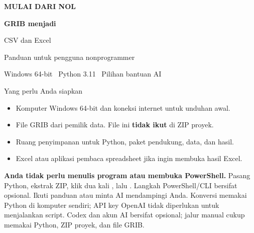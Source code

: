 \documentclass[11pt,a4paper]{article}
\begin{document}
\label{pg:start}
\color{ink}
{\color{teal}\small\bfseries MULAI DARI NOL}\par
{\color{slate}\Huge\bfseries GRIB menjadi\par CSV dan Excel}\par
\vspace{2mm}
{\Large Panduan untuk pengguna nonprogrammer}\par
Windows 64-bit \textbullet\ Python 3.11 \textbullet\ Pilihan bantuan AI\par
\vspace{6mm}
\par\noindent{}\par
\vspace{4mm}
\begin{panel}{Yang perlu Anda siapkan}
\begin{itemize}
\item Komputer Windows 64-bit dan koneksi internet untuk unduhan awal.
\item File GRIB dari pemilik data. File ini \textbf{tidak ikut} di ZIP proyek.
\item Ruang penyimpanan untuk Python, paket pendukung, data, dan hasil.
\item Excel atau aplikasi pembaca spreadsheet jika ingin membuka hasil Excel.
\end{itemize}
\end{panel}
\textbf{Anda tidak perlu menulis program atau membuka PowerShell.} Pasang Python,
ekstrak ZIP, klik dua kali , lalu .
Langkah PowerShell/CLI bersifat opsional. Ikuti panduan atau minta
AI mendampingi Anda. Konversi memakai Python di komputer sendiri; API key OpenAI
tidak diperlukan untuk menjalankan script. Codex dan akun AI bersifat opsional;
jalur manual cukup memakai Python, ZIP proyek, dan file GRIB.
\end{document}
